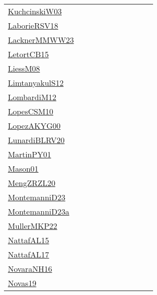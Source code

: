 {\begin{longtable}{p{3cm}p{4cm}p{2cm}p{2cm}p{2cm}p{2cm}p{2cm}p{2cm}p{2cm}p{2cm}}
\href{articles/KuchcinskiW03.pdf}{KuchcinskiW03}~\cite{KuchcinskiW03} &  &  &  &  &  &  &  &  & \\
\href{articles/LaborieRSV18.pdf}{LaborieRSV18}~\cite{LaborieRSV18} &  &  &  &  &  &  &  &  & \\
\href{articles/LacknerMMWW23.pdf}{LacknerMMWW23}~\cite{LacknerMMWW23} &  &  &  &  &  &  &  &  & \\
\href{articles/LetortCB15.pdf}{LetortCB15}~\cite{LetortCB15} &  &  &  &  &  &  &  &  & \\
\href{articles/LiessM08.pdf}{LiessM08}~\cite{LiessM08} &  &  &  &  &  &  &  &  & \\
\href{articles/LimtanyakulS12.pdf}{LimtanyakulS12}~\cite{LimtanyakulS12} &  &  &  &  &  &  &  &  & \\
\href{articles/LombardiM12.pdf}{LombardiM12}~\cite{LombardiM12} &  &  &  &  &  &  &  &  & \\
\href{articles/LopesCSM10.pdf}{LopesCSM10}~\cite{LopesCSM10} &  &  &  &  &  &  &  &  & \\
\href{articles/LopezAKYG00.pdf}{LopezAKYG00}~\cite{LopezAKYG00} &  &  &  &  &  &  &  &  & \\
\href{articles/LunardiBLRV20.pdf}{LunardiBLRV20}~\cite{LunardiBLRV20} &  &  &  &  &  &  &  &  & \\
\href{articles/MartinPY01.pdf}{MartinPY01}~\cite{MartinPY01} &  &  &  &  &  &  &  &  & \\
\href{articles/Mason01.pdf}{Mason01}~\cite{Mason01} &  &  &  &  &  &  &  &  & \\
\href{articles/MengZRZL20.pdf}{MengZRZL20}~\cite{MengZRZL20} &  &  &  &  &  &  &  &  & \\
\href{articles/MontemanniD23.pdf}{MontemanniD23}~\cite{MontemanniD23} &  &  &  &  &  &  &  &  & \\
\href{articles/MontemanniD23a.pdf}{MontemanniD23a}~\cite{MontemanniD23a} &  &  &  &  &  &  &  &  & \\
\href{articles/MullerMKP22.pdf}{MullerMKP22}~\cite{MullerMKP22} &  &  &  &  &  &  &  &  & \\
\href{articles/NattafAL15.pdf}{NattafAL15}~\cite{NattafAL15} &  &  &  &  &  &  &  &  & \\
\href{articles/NattafAL17.pdf}{NattafAL17}~\cite{NattafAL17} &  &  &  &  &  &  &  &  & \\
\href{articles/NovaraNH16.pdf}{NovaraNH16}~\cite{NovaraNH16} &  &  &  &  &  &  &  &  & \\
\href{articles/Novas19.pdf}{Novas19}~\cite{Novas19} &  &  &  &  &  &  &  &  & \\

\end{longtable}}
